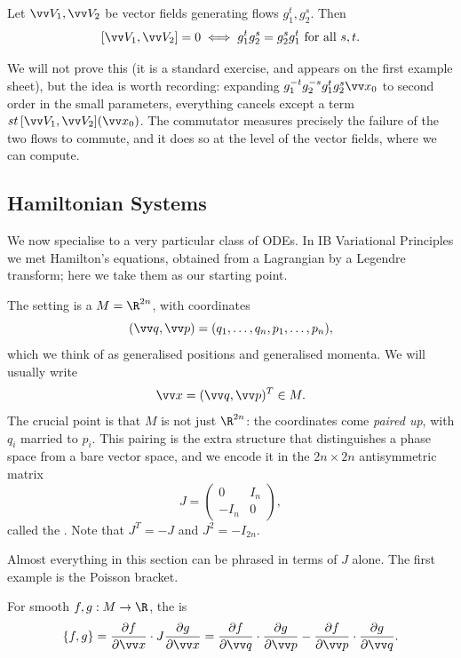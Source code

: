 \begin{proposition}
	Let $\vv V_1, \vv V_2$ be vector fields generating flows $g_1^t, g_2^s$. Then
	$$
	[\vv V_1, \vv V_2] = 0 \iff g_1^t g_2^s = g_2^s g_1^t \text{ for all } s,t.
	$$
\end{proposition}

We will not prove this (it is a standard exercise, and appears on the first example sheet), but the idea is worth recording: expanding $g_1^{-t}g_2^{-s}g_1^t g_2^s \vv x_0$ to second order in the small parameters, everything cancels except a term $st\,[\vv V_1, \vv V_2](\vv x_0)$. The commutator measures precisely the failure of the two flows to commute, and it does so at the level of the vector fields, where we can compute.

\subsection{Hamiltonian Systems}

We now specialise to a very particular class of ODEs. In IB Variational Principles we met Hamilton's equations, obtained from a Lagrangian by a Legendre transform; here we take them as our starting point.

The setting is a  $M = \R^{2n}$, with coordinates
$$
(\vv q, \vv p) = (q_1, \dots, q_n, p_1, \dots, p_n),
$$
which we think of as generalised positions and generalised momenta. We will usually write
$$
\vv x = (\vv q, \vv p)^T \in M.
$$
The crucial point is that $M$ is not just $\R^{2n}$: the coordinates come \emph{paired up}, with $q_i$ married to $p_i$. This pairing is the extra structure that distinguishes a phase space from a bare vector space, and we encode it in the $2n \times 2n$ antisymmetric matrix
$$
J = \begin{pmatrix} 0 & I_n \\ -I_n & 0\end{pmatrix},
$$
called the . Note that $J^T = -J$ and $J^2 = -I_{2n}$.

Almost everything in this section can be phrased in terms of $J$ alone. The first example is the Poisson bracket.

\begin{definition}
	For smooth $f, g : M \to \R$, the  is
	$$
	\{f, g\} = \frac{\partial f}{\partial \vv x} \cdot J \frac{\partial g}{\partial \vv x} = \frac{\partial f}{\partial \vv q}\cdot \frac{\partial g}{\partial \vv p} - \frac{\partial f}{\partial \vv p} \cdot \frac{\partial g}{\partial \vv q}.
	$$
\end{definition}

